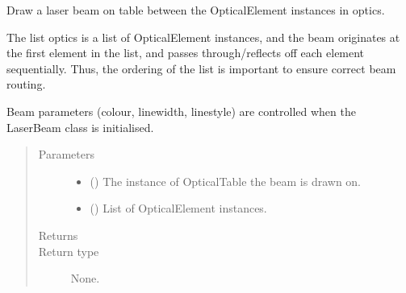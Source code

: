 \documentclass[letterpaper,10pt,english]{sphinxmanual}
\begin{document}
\begin{fulllineitems}
\begin{fulllineitems}
\begin{quote}
\begin{description}
\end{description}\end{quote}

\end{fulllineitems}


\begin{fulllineitems}
\label{\detokenize{index:pyopticaltable.LaserBeam.draw}}
\sphinxAtStartPar
Draw a laser beam on table between the OpticalElement instances in optics.

\sphinxAtStartPar
The list optics is a list of OpticalElement instances, and the beam originates
at the first element in the list, and passes through/reflects off each element
sequentially. Thus, the ordering of the list is important to ensure correct beam routing.

\sphinxAtStartPar
Beam parameters (colour, linewidth, linestyle) are controlled when the
LaserBeam class is initialised.
\begin{quote}\begin{description}
\item[{Parameters}] \leavevmode\begin{itemize}
\item {} 
\sphinxAtStartPar
{} ({\hyperref[\detokenize{index:pyopticaltable.OpticalTable}]{}}) \textendash{} The instance of OpticalTable the beam is drawn on.

\item {} 
\sphinxAtStartPar
{} () \textendash{} List of OpticalElement instances.

\end{itemize}

\item[{Returns}] \leavevmode
\sphinxAtStartPar


\item[{Return type}] \leavevmode
\sphinxAtStartPar
None.

\end{description}\end{quote}

\end{fulllineitems}


\end{fulllineitems}
\end{document}
